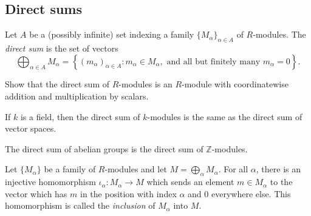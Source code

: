 \documentclass[a4paper,11pt]{article}
\begin{document}
    \subsection{Direct sums}
    \begin{definition}
      Let \(A\) be a (possibly infinite) set indexing a family \(\{M_\alpha\}_{\alpha \in A}\) of \(R\)-modules. The \emph{direct sum} is the set of vectors
      \[
        \bigoplus_{\alpha \in A} M_\alpha = \left\{ (m_\alpha)_{\alpha \in A} : m_\alpha \in M_\alpha, \text{ and all but finitely many } m_\alpha = 0 \right\}.
      \]
    \end{definition}

    \begin{exercise}
      Show that the direct sum of \(R\)-modules is an \(R\)-module with coordinatewise addition and multiplication by scalars.
    \end{exercise}

    \begin{example}
      If \(k\) is a field, then the direct sum of \(k\)-modules is the same as the direct sum of vector spaces.
    \end{example}

    \begin{example}
      The direct sum of abelian groups is the direct sum of \(\mathbb{Z}\)-modules.
    \end{example}

    \begin{example}
      Let \(\{M_\alpha\}\) be a family of \(R\)-modules and let \(M = \bigoplus_\alpha M_\alpha\). For all \(\alpha\), there is an injective homomorphism \(\iota_\alpha: M_\alpha \to M\) which sends an element \(m \in M_\alpha\) to the vector which has \(m\) in the position with index \(\alpha\) and \(0\) everywhere else. This homomorphism is called the \emph{inclusion} of \(M_\alpha\) into \(M\).
    \end{example}
\end{document}

